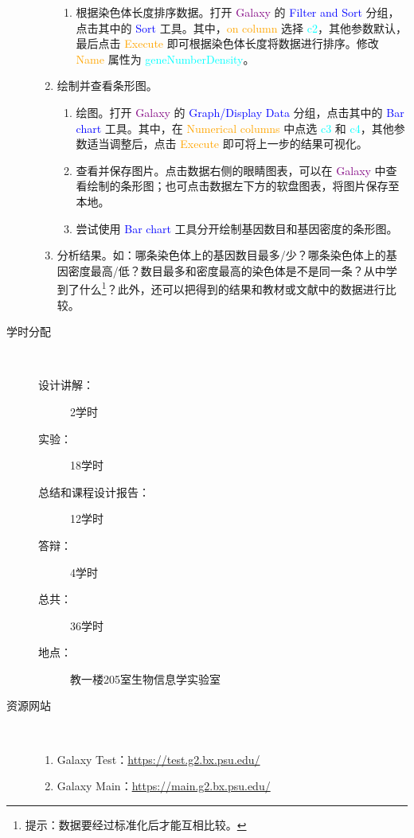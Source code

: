 \begin{description}
\begin{enumerate}
\begin{enumerate}
					\item 根据染色体长度排序数据。打开 \textcolor{purple}{Galaxy} 的 \textcolor{blue}{Filter and Sort} 分组，点击其中的 \textcolor{blue}{Sort} 工具。其中，\textcolor{orange}{on column} 选择 \textcolor{cyan}{c2}，其他参数默认，最后点击 \textcolor{orange}{Execute} 即可根据染色体长度将数据进行排序。修改 \textcolor{orange}{Name} 属性为 \textcolor{cyan}{geneNumberDensity}。
				\end{enumerate}
			\item 绘制并查看条形图。 
				\begin{enumerate}
					\item 绘图。打开 \textcolor{purple}{Galaxy} 的 \textcolor{blue}{Graph/Display Data} 分组，点击其中的 \textcolor{blue}{Bar chart} 工具。其中，在 \textcolor{orange}{Numerical columns} 中点选 \textcolor{cyan}{c3} 和 \textcolor{cyan}{c4}，其他参数适当调整后，点击 \textcolor{orange}{Execute} 即可将上一步的结果可视化。
					\item 查看并保存图片。点击数据右侧的眼睛图表，可以在 \textcolor{purple}{Galaxy} 中查看绘制的条形图；也可点击数据左下方的软盘图表，将图片保存至本地。
					\item 尝试使用 \textcolor{blue}{Bar chart} 工具分开绘制基因数目和基因密度的条形图。
				\end{enumerate}
			\item 分析结果。如：哪条染色体上的基因数目最多/少？哪条染色体上的基因密度最高/低？数目最多和密度最高的染色体是不是同一条？从中学到了什么\footnote{提示：数据要经过标准化后才能互相比较。}？此外，还可以把得到的结果和教材或文献中的数据进行比较。
		\end{enumerate}
	\item[学时分配] \ 
		\begin{description}
			\item[设计讲解：] 2学时
			\item[实验：] 18学时
			\item[总结和课程设计报告：] 12学时 
			\item[答辩：] 4学时
			\item[总共：] 36学时 
			\item[地点：] 教一楼205室生物信息学实验室 
		\end{description}
	\item[资源网站] \ 
		\begin{enumerate}
			\item Galaxy Test：\href{https://test.g2.bx.psu.edu/}{https://test.g2.bx.psu.edu/}
			\item Galaxy Main：\href{https://main.g2.bx.psu.edu/}{https://main.g2.bx.psu.edu/}
		\end{enumerate}
\end{description}


